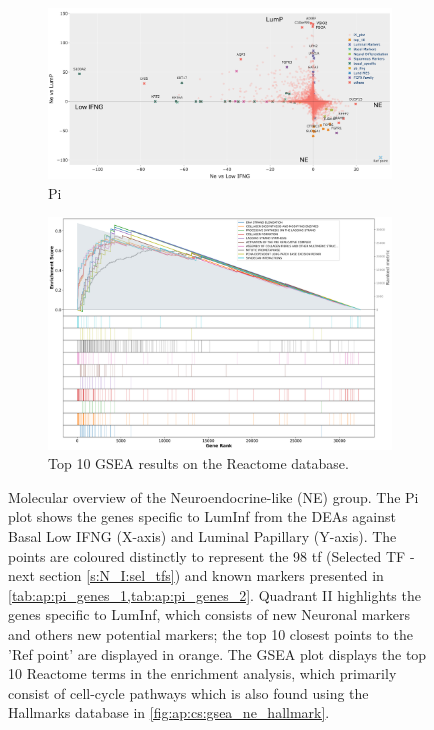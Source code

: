 \begin{figure}[!htb]
    \centering
    \captionsetup{font=small} 
    \begin{subfigure}[!t]{1.0\textwidth}
        \includegraphics[width=\textwidth,keepaspectratio]{Sections/ClusteringAnalysis/Resources/discussion/other_groups/ne_pi.png}    
        \caption{Pi}
        \label{fig:cs:ne_pi}
    \end{subfigure}
    \centering
    \begin{subfigure}[!t]{0.9\textwidth}
        \includegraphics[width=\textwidth, keepaspectratio]{Sections/ClusteringAnalysis/Resources/discussion/other_groups/ne2_reactome_10_top.png}
        \caption{Top 10 GSEA results on the Reactome database.}
        \label{fig:cs:ne_gsea}
    \end{subfigure} 
    \centering
    \caption{Molecular overview of the Neuroendocrine-like (NE) group. The Pi plot shows the genes specific to LumInf from the DEAs against Basal Low IFNG (X-axis) and Luminal Papillary (Y-axis). The points are coloured distinctly to represent the 98 \acrlong{tf} (Selected TF - next section \cref{s:N_I:sel_tfs}) and known markers presented in \cref{tab:ap:pi_genes_1,tab:ap:pi_genes_2}. Quadrant II highlights the genes specific to LumInf, which consists of new Neuronal markers and others new potential markers; the top 10 closest points to the 'Ref point' are displayed in orange. The GSEA plot displays the top 10 Reactome terms in the enrichment analysis, which primarily consist of cell-cycle pathways which is also found using the Hallmarks database in \cref{fig:ap:cs:gsea_ne_hallmark}.}
    \label{fig:cs:ne}
\end{figure}




